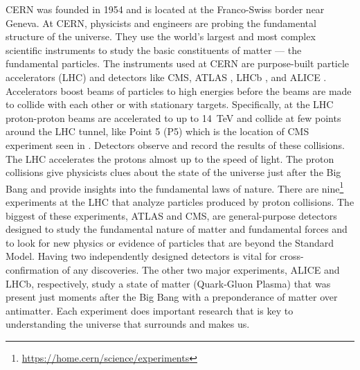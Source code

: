 CERN was founded in 1954 and is located at the Franco-Swiss border near Geneva. At CERN, physicists and engineers are probing the fundamental structure of the universe. They use the world's largest and most complex scientific instruments to study the basic constituents of matter --- the fundamental particles.
The instruments used at CERN are purpose-built particle accelerators (LHC) and detectors like CMS, ATLAS \cite{What_is_ATLAS}, LHCb \cite{What_is_LHCb}, and ALICE \cite{What_is_ALICE}. Accelerators boost beams of particles to high energies before the beams are made to collide with each other or with stationary targets. Specifically, at the LHC proton-proton beams are accelerated to up to 14~TeV and collide at few points around the LHC tunnel, like Point 5 (P5) which is the location of CMS experiment seen in .
Detectors observe and record the results of these collisions.
The LHC accelerates the protons almost up to the speed of light.
The proton collisions give physicists clues about the state of the universe just after the Big Bang and provide insights into the fundamental laws of nature. There are nine\footnote{\url{https://home.cern/science/experiments}} experiments at the LHC that analyze particles produced by proton collisions.
The biggest of these experiments, ATLAS and CMS, are general-purpose detectors designed to study the fundamental nature of matter and fundamental forces and to look for new physics or evidence of particles that are beyond the Standard Model.
Having two independently designed detectors is vital for cross-confirmation of any discoveries. The other two major experiments, ALICE and LHCb, respectively, study a state of matter (Quark-Gluon Plasma) that was present just moments after the Big Bang with a preponderance of matter over antimatter. Each experiment does important research that is key to understanding the universe that surrounds and makes us.


